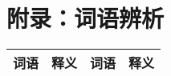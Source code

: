 \section{附录：词语辨析}
\label{sec:appendix}

\begin{longtable}{|p{}|p{}|p{}|p{}|}
    \hline
    \textbf{词语} & \textbf{释义} & \textbf
    {词语}        & \textbf{释义}           \\
    \hline
\end{longtable}